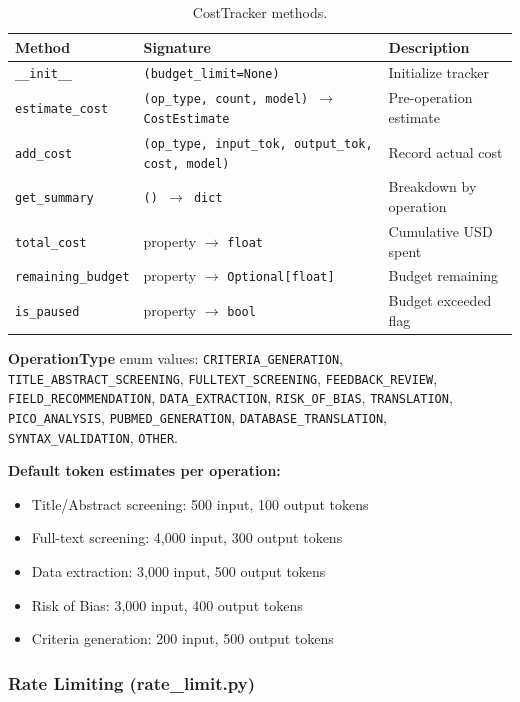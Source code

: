 \documentclass[11pt,a4paper]{article}
\begin{document}
\begin{table}[H]
\centering\small
\begin{tabular}{p{4cm}p{4.5cm}p{4.5cm}}
\toprule
\textbf{Method} & \textbf{Signature} & \textbf{Description} \\
\midrule
\texttt{\_\_init\_\_} & \texttt{(budget\_limit=None)} & Initialize tracker \\
\texttt{estimate\_cost} & \texttt{(op\_type, count, model) $\to$ CostEstimate} & Pre-operation estimate \\
\texttt{add\_cost} & \texttt{(op\_type, input\_tok, output\_tok, cost, model)} & Record actual cost \\
\texttt{get\_summary} & \texttt{() $\to$ dict} & Breakdown by operation \\
\texttt{total\_cost} & property $\to$ \texttt{float} & Cumulative USD spent \\
\texttt{remaining\_budget} & property $\to$ \texttt{Optional[float]} & Budget remaining \\
\texttt{is\_paused} & property $\to$ \texttt{bool} & Budget exceeded flag \\
\bottomrule
\end{tabular}
\caption{CostTracker methods.}
\end{table}

\textbf{OperationType} enum values: \texttt{CRITERIA\_GENERATION}, \texttt{TITLE\_ABSTRACT\_SCREENING}, \texttt{FULLTEXT\_SCREENING}, \texttt{FEEDBACK\_REVIEW}, \texttt{FIELD\_RECOMMENDATION}, \texttt{DATA\_EXTRACTION}, \texttt{RISK\_OF\_BIAS}, \texttt{TRANSLATION}, \texttt{PICO\_ANALYSIS}, \texttt{PUBMED\_GENERATION}, \texttt{DATABASE\_TRANSLATION}, \texttt{SYNTAX\_VALIDATION}, \texttt{OTHER}.

\textbf{Default token estimates per operation:}
\begin{itemize}[nosep]
  \item Title/Abstract screening: 500 input, 100 output tokens
  \item Full-text screening: 4,000 input, 300 output tokens
  \item Data extraction: 3,000 input, 500 output tokens
  \item Risk of Bias: 3,000 input, 400 output tokens
  \item Criteria generation: 200 input, 500 output tokens
\end{itemize}

\subsubsection{Rate Limiting (rate\_limit.py)}
\end{document}
